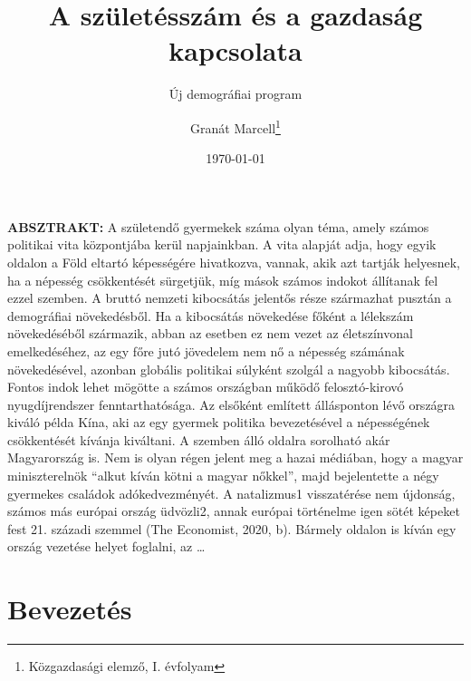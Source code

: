 \documentclass[
]{article}
\title{A születésszám és a gazdaság kapcsolata}
\subtitle{Új demográfiai program}
\author{Granát Marcell\footnote{Közgazdasági elemző, I. évfolyam}}
\date{\today}
\begin{document}
\maketitle

{
\setcounter{tocdepth}{2}
\tableofcontents
}
\thispagestyle{empty}

\textbf{ABSZTRAKT: } A születendő gyermekek száma olyan téma, amely
számos politikai vita központjába kerül napjainkban. A vita alapját
adja, hogy egyik oldalon a Föld eltartó képességére hivatkozva, vannak,
akik azt tartják helyesnek, ha a népesség csökkentését sürgetjük, míg
mások számos indokot állítanak fel ezzel szemben. A bruttó nemzeti
kibocsátás jelentős része származhat pusztán a demográfiai növekedésből.
Ha a kibocsátás növekedése főként a lélekszám növekedéséből származik,
abban az esetben ez nem vezet az életszínvonal emelkedéséhez, az egy
főre jutó jövedelem nem nő a népesség számának növekedésével, azonban
globális politikai súlyként szolgál a nagyobb kibocsátás. Fontos indok
lehet mögötte a számos országban működő felosztó-kirovó nyugdíjrendszer
fenntarthatósága. Az elsőként említett állásponton lévő országra kiváló
példa Kína, aki az egy gyermek politika bevezetésével a népességének
csökkentését kívánja kiváltani. A szemben álló oldalra sorolható akár
Magyarország is. Nem is olyan régen jelent meg a hazai médiában, hogy a
magyar miniszterelnök ``alkut kíván kötni a magyar nőkkel'', majd
bejelentette a négy gyermekes családok adókedvezményét. A natalizmus1
visszatérése nem újdonság, számos más európai ország üdvözli2, annak
európai történelme igen sötét képeket fest 21. századi szemmel (The
Economist, 2020, b). Bármely oldalon is kíván egy ország vezetése helyet
foglalni, az \ldots{}

\pagebreak
\setcounter{page}{1}

\hypertarget{bevezetuxe9s}{%
\section{Bevezetés}\label{bevezetuxe9s}}
\end{document}
